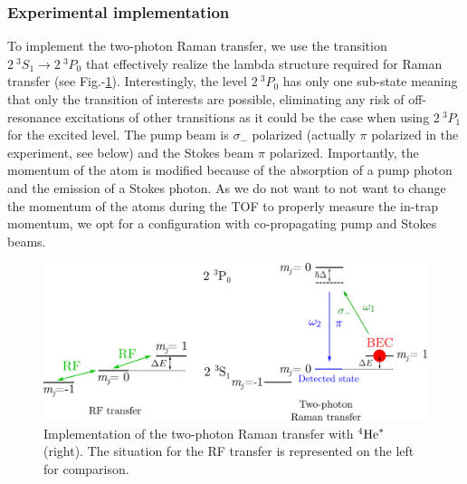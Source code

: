 \subsubsection{Experimental implementation}

To implement the two-photon Raman transfer, we use the transition $2 \ ^3 S_1 \rightarrow 2 \ ^3 P_0$ that effectively realize the lambda structure required for Raman transfer (see Fig.-\ref{fig:raman_exp}). Interestingly, the level $2 \ ^3 P_0$ has only one sub-state meaning that only the transition of interests are possible, eliminating any risk of off-resonance excitations of other transitions as it could be the case when using $2 \ ^3 P_1$ for the excited level. The pump beam is $\sigma_-$ polarized (actually $\pi$ polarized in the experiment, see below) and the Stokes beam $\pi$ polarized. Importantly, the momentum of the atom is modified because of the absorption of a pump photon and the emission of a Stokes photon. As we do not want to not want to change the momentum of the atoms during the TOF to properly measure the in-trap momentum, we opt for a configuration with co-propagating pump and Stokes beams.

\begin{figure}
    \centering
    \includegraphics[width=\textwidth]{Fig/Chapter3/raman_exp.png}
    \caption[Implementation of the two-photon Raman transfer with $^4 \rm{He}^*$]{Implementation of the two-photon Raman transfer with $^4 \rm{He}^*$ (right). The situation for the RF transfer is represented on the left for comparison.}
    \label{fig:raman_exp}
\end{figure}


